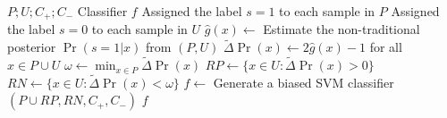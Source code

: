 \documentclass{article}
\begin{document}
\begin{algorithm}[!h]
\renewcommand{\algorithmicrequire}{\textbf{Input:}} %
\renewcommand{\algorithmicensure}{\textbf{Output:}} %
	\caption{PGPU} %
	\begin{algorithmic}[1] %
	    \REQUIRE
	    $P;U;C_+;C_-$
	    \ENSURE
	    Classifier $f$
	    \STATE Assigned the label $s=1$ to each sample in $P$
	    \STATE Assigned the label $s=0$ to each sample in $U$
	    \STATE $\hat{g}(x)\leftarrow$ Estimate the non-traditional posterior $\Pr(s=1|x)$ from $(P,U)$ %
	    \STATE $\tilde{\Delta}\Pr(x)\leftarrow 2\hat{g}(x)-1$ for all $x\in P\cup U$ %
	    \STATE $\omega\leftarrow \min_{x\in P}\tilde{\Delta}\Pr(x)$ %
	    \STATE $RP\leftarrow \{x\in U: \tilde{\Delta}\Pr(x)>0\}$ %
	    \STATE $RN\leftarrow \{x\in U: \tilde{\Delta}\Pr(x)<\omega\}$ %
	    \STATE $f\leftarrow$ Generate a biased SVM classifier$(P\cup RP,RN,C_+,C_-)$
		\RETURN $f$
	\end{algorithmic}
\end{algorithm}
\end{document}
